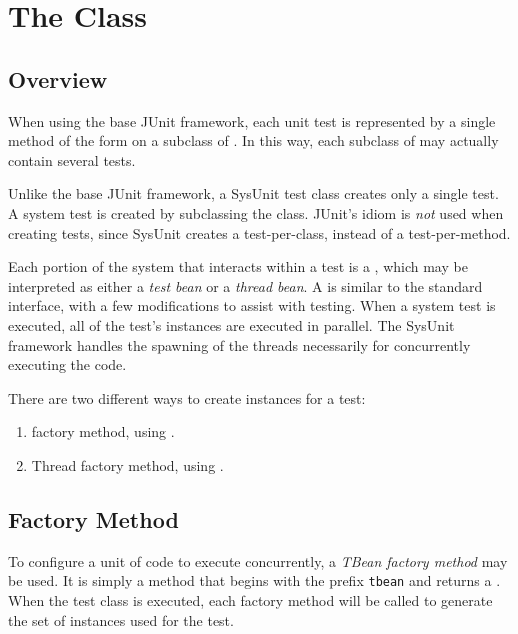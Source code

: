 \chapter{The  Class}

\section{Overview}

When using the base JUnit framework, each unit test
is represented by a single method of the form 
 on a subclass of .
In this way, each subclass of  may actually
contain several tests.

Unlike the base JUnit framework, a SysUnit test class creates
only a single test.  A system test is created by subclassing
the  class.  JUnit's 
idiom is \emph{not} used when creating tests, since SysUnit
creates a test-per-class, instead of a test-per-method.

Each portion of the system that interacts within a test
is a , which may be interpreted as either
a \emph{test bean} or a \emph{thread bean}.  A
 is similar to the standard 
interface, with a few modifications to assist with testing.
When a system test is executed, all of the test's 
instances are executed in parallel.  The SysUnit framework
handles the spawning of the threads necessarily for 
concurrently executing the code.

There are two different ways to create  instances
for a test:  

\begin{enumerate}
	\item {} factory method, using
.
	\item Thread factory method, using
.
\end{enumerate}


\section{ Factory Method}

To configure a unit of code to execute concurrently, a
\emph{TBean factory method} may be used.  It is simply
a method that begins with the prefix \texttt{tbean} and returns
a .  When the test class is executed, each
 factory method will be called to generate
the set of  instances used for the test.

